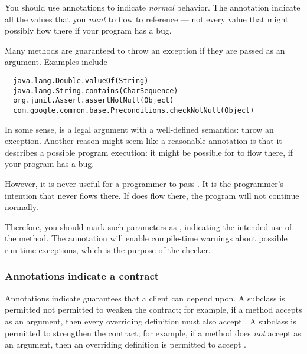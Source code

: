 You should use annotations to indicate \emph{normal} behavior.  The
annotation indicate all the values that you \emph{want} to flow to
reference --- not every value that might possibly flow there if your
program has a bug.

Many methods are guaranteed to throw an exception if they are passed 
as an argument.  Examples include

\begin{Verbatim}
  java.lang.Double.valueOf(String)
  java.lang.String.contains(CharSequence)
  org.junit.Assert.assertNotNull(Object)
  com.google.common.base.Preconditions.checkNotNull(Object)
\end{Verbatim}

In some sense,  is a legal argument with a well-defined
semantics:  throw an exception.  Another reason  might seem
like a reasonable annotation is that it describes a possible program
execution:  it might be possible for  to flow there, if your
program has a bug.


However, it is never useful for a programmer to pass .  It is
the programmer's intention that  never flows there.  If
 does flow there, the program will not continue normally.

Therefore, you should mark such parameters as , indicating
the intended use of the method.  The  annotation will enable
compile-time warnings about possible run-time exceptions, which is the
purpose of the checker.




\subsubsection{Annotations indicate a contract\label{annotations-are-a-contract}}

Annotations indicate guarantees that a client can depend upon.  A subclass
is permitted not permitted to weaken the contract; for example,
if a method accepts  as an argument, then every overriding
definition must also accept .
A subclass is permitted to strengthen the contract; for example,
if a method does \emph{not} accept  as an argument, then an 
overriding definition is permitted to accept .

